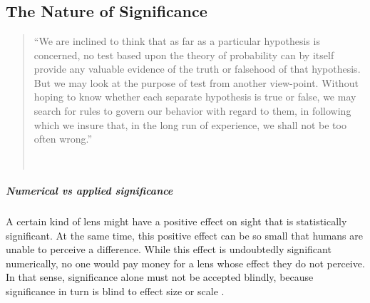 
\newcommand{\hnaught}{\textit{H}\textsubscript{\addfontfeature{Numbers=Lining}0}}
\newcommand{\hone}{\textit{H}\textsubscript{\addfontfeature{Numbers=Lining}1}}


\chapter{\significance}
\label{ch:significance}

\section{The Nature of Significance}
\label{sec:significancenature}

\begin{quote}\small\singlespacing
``We are inclined to think that as far as a particular hypothesis is concerned, no test based upon the theory of probability can by itself provide any valuable evidence of the truth or falsehood of that hypothesis. But we may look at the purpose of test from another view-point. Without hoping to know whether each separate hypothesis is true or false, we may search for rules to govern our behavior with regard to them, in following which we insure that, in the long run of experience, we shall not be too often wrong.''

~ \hfill \citep[]{neyman33}
\end{quote}

\paragraph{Numerical vs applied significance} A certain kind of lens might have a positive effect on sight that is statistically significant. At the same time, this positive effect can be so small that humans are unable to perceive a difference. While this effect is undoubtedly significant numerically, no one would pay money for a lens whose effect they do not perceive. In that sense, significance alone must not be accepted blindly, because significance in turn is blind to effect size or scale \citep[]{frost17}.

